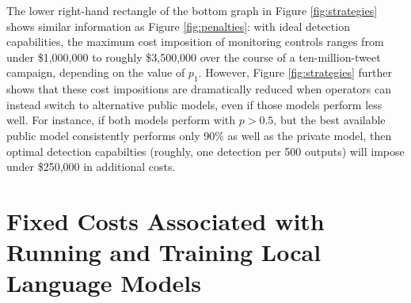\documentclass{article}
\begin{document}
The lower right-hand rectangle of the bottom graph in Figure \ref{fig:strategies} shows similar information as Figure \ref{fig:penalties}: with ideal detection capabilities, the maximum cost imposition of monitoring controls ranges from under \$1,000,000 to roughly \$3,500,000 over the course of a ten-million-tweet campaign, depending on the value of $p_1$. However, Figure \ref{fig:strategies} further shows that these cost impositions are dramatically reduced when operators can instead switch to alternative public models, even if those models perform less well. For instance, if both models perform with $p > 0.5$, but the best available public model consistently performs only 90\% as well as the private model, then optimal detection capabilties (roughly, one detection per 500 outputs) will impose under \$250,000 in additional costs. 

\section{Fixed Costs Associated with Running and Training Local Language Models}
\label{sec:fixedcosts}
\end{document}
